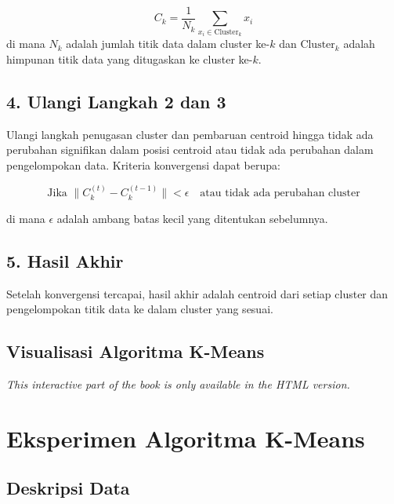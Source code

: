 \documentclass[
  oneside]{book}
\begin{document}
\[
C_k = \frac{1}{N_k} \sum_{x_i \in \text{Cluster}_k} x_i
\]
di mana \(N_k\) adalah jumlah titik data dalam cluster ke-\(k\) dan \(\text{Cluster}_k\) adalah himpunan titik data yang ditugaskan ke cluster ke-\(k\).

\subsection*{4. Ulangi Langkah 2 dan 3}\label{ulangi-langkah-2-dan-3}

Ulangi langkah penugasan cluster dan pembaruan centroid hingga tidak ada perubahan signifikan dalam posisi centroid atau tidak ada perubahan dalam pengelompokan data. Kriteria konvergensi dapat berupa:

\[
\text{Jika } \| C_k^{(t)} - C_k^{(t-1)} \| < \epsilon \quad \text{atau tidak ada perubahan cluster}
\]

di mana \(\epsilon\) adalah ambang batas kecil yang ditentukan sebelumnya.

\subsection*{5. Hasil Akhir}\label{hasil-akhir}

Setelah konvergensi tercapai, hasil akhir adalah centroid dari setiap cluster dan pengelompokan titik data ke dalam cluster yang sesuai.

\subsection*{Visualisasi Algoritma K-Means}\label{visualisasi-algoritma-k-means}

\begin{center}\textit{This interactive part of the book is only available in the HTML version.}\end{center}

\section{Eksperimen Algoritma K-Means}\label{eksperimen-algoritma-k-means}

\subsection*{Deskripsi Data}\label{deskripsi-data}
\end{document}
